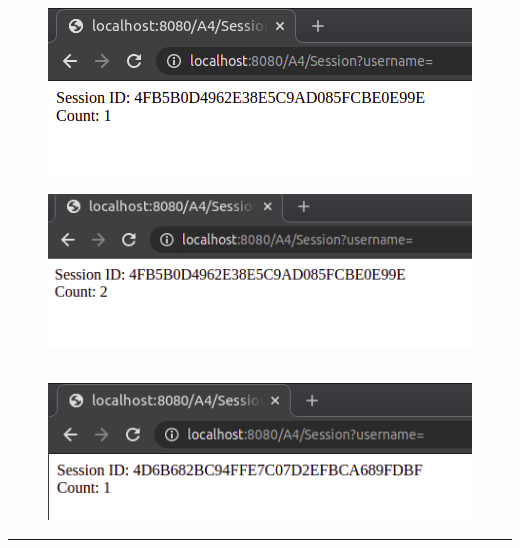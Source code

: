 \documentclass[12pt,letterpaper]{article}
\begin{document}
\subsection*{}
\begin{figure}[h]
    \centering
    \includegraphics[width = \textwidth]{Pics/chrome1.png}
\end{figure}
\begin{figure}[h!]
    \centering
    \includegraphics[width = \textwidth]{Pics/chrome2.png}
\end{figure}
\subsection*{}
\begin{figure}[h!]
    \centering
    \includegraphics[width = \textwidth]{Pics/chrome3.png}
\end{figure}
\hrule
\end{document}
